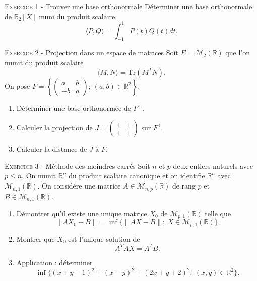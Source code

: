 \documentclass[11pt]{article}
\begin{document}
 

\begin{center}\textsc{{\huge }}\end{center}



\vskip0.3cm\noindent\textsc{Exercice 1} - Trouver une base orthonormale
\vskip0.2cm
Déterminer une base orthonormale de $\mathbb R_2[X]$ muni du produit scalaire 
$$\langle P,Q\rangle=\int_{-1}^1 P(t)Q(t)dt.$$




\vskip0.3cm\noindent\textsc{Exercice 2} - Projection dans un espace de matrices
\vskip0.2cm
Soit $E=\mathcal M_2(\mathbb R)$ que l'on munit du produit scalaire
$$\langle M,N\rangle=\textrm{Tr}(M^TN).$$
On pose $F=\left\{\begin{pmatrix}
                         a&b\\
                         -b&a
                        \end{pmatrix};\ (a,b)\in\mathbb R^2\right\}.$
\begin{enumerate}
 \item Déterminer une base orthonormée de $F^\perp$.
 \item Calculer la projection de $J=\begin{pmatrix}1&1\\
                                     1&1
                                    \end{pmatrix}$
sur $F^\perp$.
\item Calculer la distance de $J$ à $F.$
\end{enumerate}




\vskip0.3cm\noindent\textsc{Exercice 3} - Méthode des moindres carrés
\vskip0.2cm
Soit $n$ et $p$ deux entiers naturels avec $p\leq n$. On munit $\mathbb R^n$ du produit scalaire canonique et on identifie $\mathbb R^n$ avec $\mathcal M_{n,1}(\mathbb R)$. On considère une matrice $A\in\mathcal M_{n,p}(\mathbb R)$ de rang $p$ et $B\in\mathcal M_{n,1}(\mathbb R)$. 
\begin{enumerate}
\item Démontrer qu'il existe une unique matrice $X_0$ de $\mathcal M_{p,1}(\mathbb R)$ telle que 
$$\|AX_0-B\|=\inf\{\|AX-B\|;\ X\in\mathcal M_{p,1}(\mathbb R)\}.$$
\item Montrer que $X_0$ est l'unique solution de 
$$A^T AX=A^T B.$$
\item Application : déterminer 
$$\inf\{(x+y-1)^2+(x-y)^2+(2x+y+2)^2;\ (x,y)\in\mathbb R^2\}.$$
\end{enumerate}




\vskip0.5cm

\end{document}
